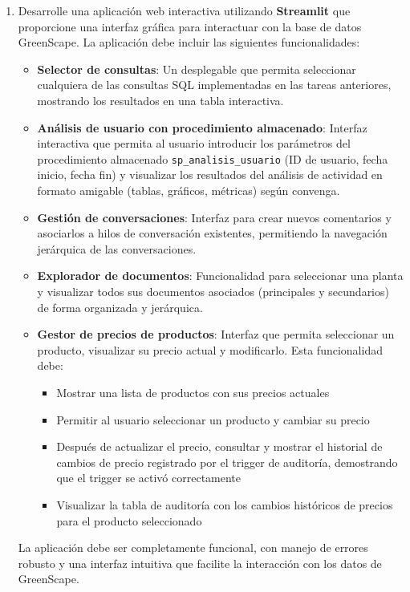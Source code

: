 \documentclass[10pt]{article}
\begin{document}
\begin{enumerate}
		\item Desarrolle una aplicación web interactiva utilizando \textbf{Streamlit} que proporcione una interfaz gráfica para interactuar con la base de datos GreenScape. La aplicación debe incluir las siguientes funcionalidades:
		
		\begin{itemize}
			\item \textbf{Selector de consultas}: Un desplegable que permita seleccionar cualquiera de las consultas SQL implementadas en las tareas anteriores, mostrando los resultados en una tabla interactiva.
			
			\item \textbf{Análisis de usuario con procedimiento almacenado}: Interfaz interactiva que permita al usuario introducir los parámetros del procedimiento almacenado \texttt{sp\_analisis\_usuario} (ID de usuario, fecha inicio, fecha fin) y visualizar los resultados del análisis de actividad en formato amigable (tablas, gráficos, métricas) según convenga.
			
			\item \textbf{Gestión de conversaciones}: Interfaz para crear nuevos comentarios y asociarlos a hilos de conversación existentes, permitiendo la navegación jerárquica de las conversaciones.
			
			\item \textbf{Explorador de documentos}: Funcionalidad para seleccionar una planta y visualizar todos sus documentos asociados (principales y secundarios) de forma organizada y jerárquica.
			
			\item \textbf{Gestor de precios de productos}: Interfaz que permita seleccionar un producto, visualizar su precio actual y modificarlo. Esta funcionalidad debe:
			\begin{itemize}
				\item Mostrar una lista de productos con sus precios actuales
				\item Permitir al usuario seleccionar un producto y cambiar su precio
				\item Después de actualizar el precio, consultar y mostrar el historial de cambios de precio registrado por el trigger de auditoría, demostrando que el trigger se activó correctamente
				\item Visualizar la tabla de auditoría con los cambios históricos de precios para el producto seleccionado
			\end{itemize}
		\end{itemize}
		
		La aplicación debe ser completamente funcional, con manejo de errores robusto y una interfaz intuitiva que facilite la interacción con los datos de GreenScape.
		
	\end{enumerate}
	
\end{document}
